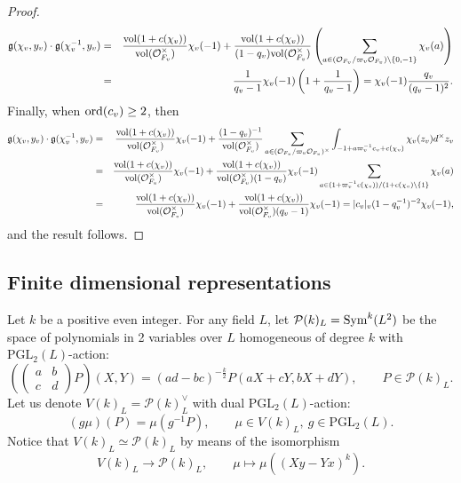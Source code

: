 \documentclass{amsart}
\theoremstyle{definition}
\theoremstyle{remark}
\numberwithin{equation}{section}
\newcommand{\PGL}{{\mathrm{PGL}}}
\newcommand{\cP}{{\mathcal P}}
\newcommand{\cO}{{\mathcal O}}
\begin{document}
\begin{proof}
   \begin{eqnarray*}
     \mathfrak{g}(\chi_v,y_v)\cdot \mathfrak{g}(\chi_v^{-1},y_v)&=&\frac{{\rm vol}(1+c(\chi_v))}{{\rm vol}(\cO_{F_v}^\times)}\chi_v(-1)+\frac{{\rm vol}(1+c(\chi_v))}{(1-q_v){\rm vol}(\cO_{F_v}^\times)}\left(\sum_{a\in(\cO_{F_v}/\varpi_v\cO_{F_v})\setminus\{0,-1\}}\chi_v(a)\right)\\
    &=&\frac{1}{q_v-1}\chi_v(-1)\left(1+\frac{1}{q_v-1}\right)=\chi_v(-1)\frac{q_v}{(q_v-1)^2}.
   \end{eqnarray*}
    Finally, when ${\rm ord}(c_v)\geq 2$, then
    \begin{eqnarray*}
     \mathfrak{g}(\chi_v,y_v)\cdot \mathfrak{g}(\chi_v^{-1},y_v)&=&\frac{{\rm vol}(1+c(\chi_v))}{{\rm vol}(\cO_{F_v}^\times)}\chi_v(-1)+\frac{(1-q_v)^{-1}}{{\rm vol}(\cO_{F_v}^\times)}\sum_{a\in (\cO_{F_v}/\varpi_v\cO_{F_v})^\times}\int_{-1+a\varpi_v^{-1}c_v+c(\chi_v)}\chi_v(z_v)d^\times z_v\\
     &=&\frac{{\rm vol}(1+c(\chi_v))}{{\rm vol}(\cO_{F_v}^\times)}\chi_v(-1)+\frac{{\rm vol}(1+c(\chi_v))}{{\rm vol}(\cO_{F_v}^\times)(1-q_v)}\chi_v(-1)\sum_{a\in (1+\varpi_v^{-1}c(\chi_v))/(1+c(\chi_v)\setminus \{1\}}\chi_v(a)\\
     &=&\frac{{\rm vol}(1+c(\chi_v))}{{\rm vol}(\cO_{F_v}^\times)}\chi_v(-1)+\frac{{\rm vol}(1+c(\chi_v))}{{\rm vol}(\cO_{F_v}^\times)(q_v-1)}\chi_v(-1)=|c_v|_v(1-q_v^{-1})^{-2}\chi_v(-1),
   \end{eqnarray*}
   and the result follows. 
\end{proof}


\subsection{Finite dimensional representations}\label{findimreps}

Let $k$ be a positive even integer. For any field $L$,
let $\cP(k)_L={\rm Sym}^k(L^2)$ be the space of polynomials in 2 variables over $L$ homogeneous of degree $k$ with $\PGL_2(L)$-action:
\[
\left(\left(\begin{array}{cc}a&b\\c& d\end{array}\right)P\right)(X,Y)=(ad-bc)^{-\frac{k}{2}}P(aX+cY,bX+dY),\qquad P\in\cP(k)_L.
\]  
Let us denote $V(k)_L=\cP(k)_L^\vee$ with dual $\PGL_2(L)$-action:
\[
(g\mu)(P)=\mu(g^{-1}P),\qquad \mu\in V(k)_L, \ g \in \PGL_2(L).
\]  
Notice that $V(k)_L\simeq \cP(k)_L$ by means of the isomorphism
\begin{equation}\label{dualVP}
V(k)_L\longrightarrow\cP(k)_L,\qquad\mu\longmapsto\mu((Xy-Yx)^k).
\end{equation}
\end{document}
